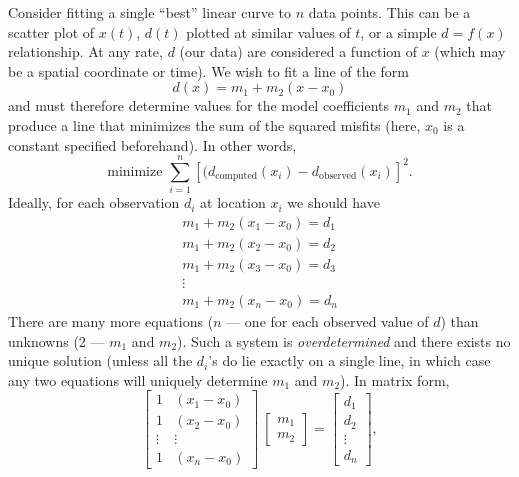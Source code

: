 	Consider fitting a single ``best'' linear curve to $n$ data points. This can be a scatter plot of $x(t)$, $d(t)$ 
plotted at similar values of $t$, or a simple $d = f(x)$ relationship. At any rate, $d$ (our data) are considered a 
function of $x$ (which may be a spatial coordinate or time). We wish to fit a line of the form
\begin{equation}
d(x) = m_1 + m_2 (x-x_0)
\end{equation}
and must therefore determine values for the model coefficients $m_1$ and $m_2$ that produce a line that minimizes the sum 
of the squared misfits (here, $x_0$ is a constant specified beforehand). In other words,
\begin{equation}
\mbox{minimize } \sum ^n _{i=1} \left [(d_{\mbox{computed}}(x_i) - d_{\mbox{observed}}(x_i) \right ]^2.
\end{equation}	 
Ideally, for each observation $d_i$ at location $x_i$ we should have
\begin{equation}
\begin{array}{c}
m_1 + m_2(x_1 - x_0) = d_1\\
m_1 + m_2(x_2 - x_0) = d_2\\
m_1 + m_2(x_3 - x_0) = d_3\\
\vdots\\
m_1 + m_2 (x_n - x_0) = d_n
\end{array}
\end{equation}
There are many more equations ($n$ --- one for each observed value of $d$) than unknowns (2 --- $m_1$ and 
$m_2$). Such a system is \emph{overdetermined} and there exists no unique solution (unless all the $d_i$'s do 
lie exactly on a single line, in which case any two equations will uniquely determine $m_1$ and $m_2$).  
In matrix form,
\begin{equation}
\left[
\begin{array}{cc}
1 & (x_1 - x_0) \\
1 & (x_2 - x_0) \\
\vdots & \vdots \\
1 & (x_n - x_0) 
\end{array} \right]
\ \left [ \begin{array}{c}
m_1\\
m_2
\end{array} \right ] =
\left [ \begin{array}{c}
d_1\\
d_2\\
\vdots\\
d_n
\end{array} \right ],
\end{equation}
